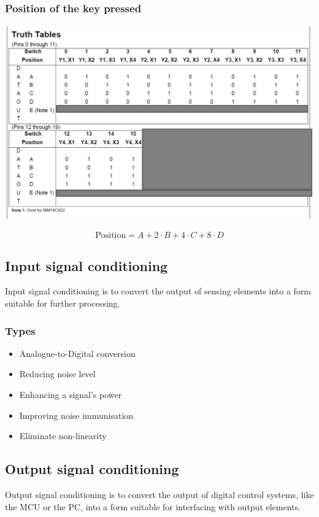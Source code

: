 \documentclass[11pt]{article}
\begin{document}
\subsubsection{Position of the key pressed}
\label{sec:org98998da}
\begin{center}
\includegraphics[width=.9\linewidth]{./images/74c922-keypad-encoder-truth-table.png}
\end{center}
\[\text{Position} = A + 2 \cdot B + 4 \cdot C + 8 \cdot D\]

 \newpage

\subsection{Input signal conditioning}
\label{sec:org8097c40}
Input signal conditioning is to convert the output of sensing elements into a form suitable for further processing.

\subsubsection{Types}
\label{sec:orged7db39}
\begin{itemize}
\item Analogue-to-Digital conversion
\item Reducing noise level
\item Enhancing a signal's power
\item Improving noise immunisation
\item Eliminate non-linearity
\end{itemize}

\subsection{Output signal conditioning}
\label{sec:orgc498332}
Output signal conditioning is to convert the output of digital control systems, like the MCU or the PC, into a form suitable for interfacing with output elements.
\end{document}
